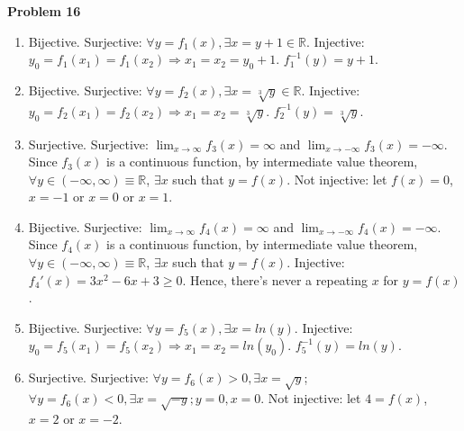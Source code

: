 \documentclass{article}
\begin{document}
\textbf{Problem 16}
\begin{enumerate}[label={(\roman*)}]
    \item Bijective. Surjective: $\forall y=f_1(x), \exists x = y +1\in \mathbb{R}$. Injective: $y_0=f_1(x_1)=f_1(x_2)\Rightarrow x_1=x_2=y_0+1$. $f_1^{-1}(y)=y+1$.
    \item Bijective. Surjective: $\forall y=f_2(x), \exists x = \sqrt[3]{y}\in \mathbb{R}$. Injective: $y_0=f_2(x_1)=f_2(x_2)\Rightarrow x_1=x_2=\sqrt[3]{y}$. $f_2^{-1}(y)=\sqrt[3]{y}$.
    \item Surjective. Surjective: $\lim_{x\rightarrow \infty}f_3(x)=\infty$ and $\lim_{x\rightarrow -\infty}f_3(x)=-\infty$. Since $f_3(x)$ is a continuous function, by intermediate value theorem, $\forall y  \in (-\infty,\infty)\equiv \mathbb{R}$, $\exists x$ such that $y=f(x)$. Not injective: let $f(x)=0$, $x=-1$ or $x=0$ or $x=1$.
    \item Bijective. Surjective: $\lim_{x\rightarrow \infty}f_4(x)=\infty$ and $\lim_{x\rightarrow -\infty}f_4(x)=-\infty$. Since $f_4(x)$ is a continuous function, by intermediate value theorem, $\forall y  \in (-\infty,\infty)\equiv \mathbb{R}$, $\exists x$ such that $y=f(x)$. Injective: $f_4'(x)=3x^2-6x+3\ge 0$. Hence, there's never a repeating $x$ for $y=f(x)$.
    \item Bijective. Surjective: $\forall y = f_5(x), \exists x = ln(y)$. Injective: $y_0=f_5(x_1)=f_5(x_2)\Rightarrow x_1=x_2=ln(y_0)$. $f_5^{-1}(y)=ln(y)$.
    \item Surjective. Surjective: $\forall y = f_6(x) > 0, \exists x=\sqrt{y}$; $\forall y=f_6(x)<0,\exists x=\sqrt{-y};y=0,x=0$. Not injective: let $4=f(x)$, $x=2$ or $x=-2$.
\end{enumerate}
\end{document}
